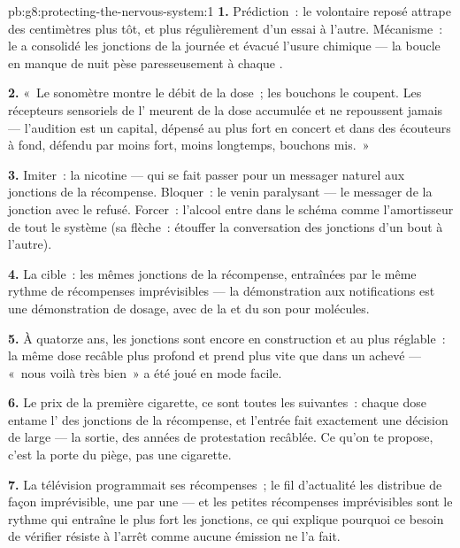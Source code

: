 \begin{solution}{pb:g8:protecting-the-nervous-system:1}
\textbf{1.} Prédiction~: le volontaire reposé attrape des
centimètres plus tôt, et plus régulièrement d'un essai à
l'autre. Mécanisme~: le  a consolidé les jonctions
de la journée et évacué l'usure chimique --- la boucle en
manque de nuit pèse paresseusement à chaque .

\textbf{2.} «~Le sonomètre montre le débit de la dose~; les
bouchons le coupent. Les récepteurs sensoriels de l'
meurent de la dose accumulée et ne repoussent jamais ---
l'audition est un capital, dépensé au plus fort en concert
et dans des écouteurs à fond, défendu par moins fort, moins
longtemps, bouchons mis.~»

\textbf{3.} Imiter~: la nicotine --- qui se fait passer
pour un messager naturel aux jonctions de la récompense.
Bloquer~: le venin paralysant --- le messager de la
jonction avec le  refusé. Forcer~: l'alcool entre
dans le schéma comme l'amortisseur de tout le système (sa
flèche~: étouffer la conversation des jonctions d'un bout à
l'autre).

\textbf{4.} La cible~: les mêmes jonctions de la
récompense, entraînées par le même rythme de récompenses
imprévisibles --- la démonstration aux notifications est
une démonstration de dosage, avec de la  et du son
pour molécules.

\textbf{5.} À quatorze ans, les jonctions sont encore en
construction et au plus réglable~: la même dose recâble
plus profond et prend plus vite que dans un 
achevé --- «~nous voilà très bien~» a été joué en mode
facile.

\textbf{6.} Le prix de la première cigarette, ce sont
toutes les suivantes~: chaque dose entame l' des
jonctions de la récompense, et l'entrée fait exactement une
décision de large --- la sortie, des années de protestation
recâblée. Ce qu'on te propose, c'est la porte du piège, pas
une cigarette.

\textbf{7.} La télévision programmait ses récompenses~; le
fil d'actualité les distribue de façon imprévisible, une
par une --- et les petites récompenses imprévisibles sont
le rythme qui entraîne le plus fort les jonctions, ce qui
explique pourquoi ce besoin de vérifier résiste à l'arrêt
comme aucune émission ne l'a fait.


\end{solution}
